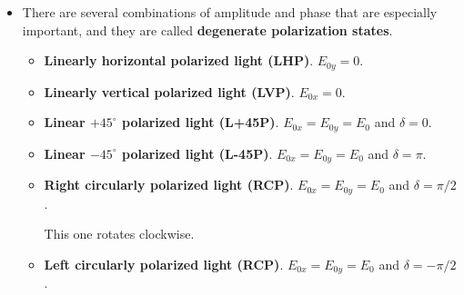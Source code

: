 \documentclass[10pt]{article}
\begin{document}
\begin{itemize}
		\item There are several combinations of amplitude and phase that are especially important, and they are called \textbf{degenerate polarization states}.
		\begin{itemize}
			\item \textbf{Linearly horizontal polarized light (LHP)}. $E_{0y} = 0$.
			\begin{center}
			\end{center}
			\item \textbf{Linearly vertical polarized light (LVP)}. $E_{0x} = 0$.
			\begin{center}
			\end{center}
			\item \textbf{Linear $+45^\circ$ polarized light (L+45P)}. $E_{0x} = E_{0y} = E_0$ and $\delta = 0$.
			\begin{center}
			\end{center}
			\item \textbf{Linear $-45^\circ$ polarized light (L-45P)}.
			$E_{0x} = E_{0y} = E_0$ and $\delta = \pi$.
			\begin{center}
			\end{center}
			\item \textbf{Right circularly polarized light (RCP)}. $E_{0x} = E_{0y} = E_0$ and $\delta = \pi/2$.
			\begin{center}
			\end{center}
			This one rotates clockwise.
			\item \textbf{Left circularly polarized light (RCP)}. $E_{0x} = E_{0y} = E_0$ and $\delta = -\pi/2$.
			\begin{center}

\end{center}
\end{itemize}
\end{itemize}
\end{document}
